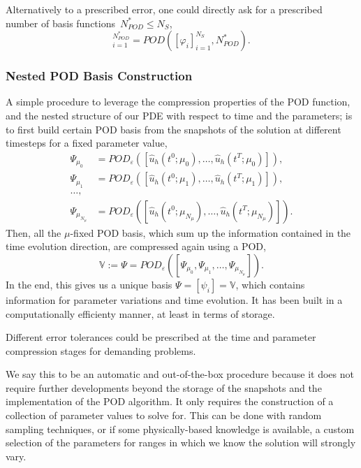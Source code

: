 \documentclass[../../thesis.tex]{subfiles}
\newcommand{\rbV}{\ensuremath{\mathbb{V}}}
\begin{document}
Alternatively to a prescribed error, one could directly ask for a prescribed number of basis functions~$N^{*}_{POD} \leq N_S$,
\begin{equation}
    [\psi_i]_{i=1}^{N^{*}_{POD}} = POD\left([\varphi_i]_{i=1}^{N_S}, N^{*}_{POD}\right).
\end{equation}

\subsubsection{Nested POD Basis Construction}
\label{sec:1d_rom_burgers_basis_construction_nested}
A simple procedure to leverage the compression properties of the POD function, 
and the nested structure of our PDE with respect to time and the parameters; 
is to first build certain POD basis from the snapshots of the solution at different timesteps for a fixed parameter value,
\begin{align*}
    \Psi_{\mu_0} &= POD_{\varepsilon}\left(\left[\hat{u}_h(t^0; \mu_0), \ldots, \hat{u}_h(t^T; \mu_0)\right]\right), \\
    \Psi_{\mu_1} &= POD_{\varepsilon}\left(\left[\hat{u}_h(t^0; \mu_1), \ldots, \hat{u}_h(t^T; \mu_1)\right]\right), \\  
    \ldots, \\
    \Psi_{\mu_{N_{\mu}}} &= POD_{\varepsilon}\left(\left[\hat{u}_h(t^0; \mu_{N_{\mu}}), \ldots, \hat{u}_h(t^T; \mu_{N_{\mu}})\right]\right).
\end{align*}
Then, all the $\mu$-fixed POD basis, which sum up the information contained in the time evolution direction, are compressed again using a POD,
\begin{equation*}
    \rbV := \Psi = POD_{\varepsilon} \left(\left[\Psi_{\mu_0}, \Psi_{\mu_1}, \ldots, \Psi_{\mu_{N_{\mu}}}\right]\right).
\end{equation*}
In the end, this gives us a unique basis $\Psi = [\psi_i] = \rbV$, 
which contains information for parameter variations and time evolution.
It has been built in a computationally efficienty manner, 
at least in terms of storage.

Different error tolerances could be prescribed at the time and parameter compression stages
for demanding problems.

We say this to be an automatic and out-of-the-box procedure because it does not require further developments 
beyond the storage of the snapshots and the implementation of the POD algorithm.
It only requires the construction of a collection of parameter values to solve for.
This can be done with random sampling techniques, 
or if some physically-based knowledge is available, 
a custom selection of the parameters for ranges in which we know the solution will strongly vary.
\end{document}
